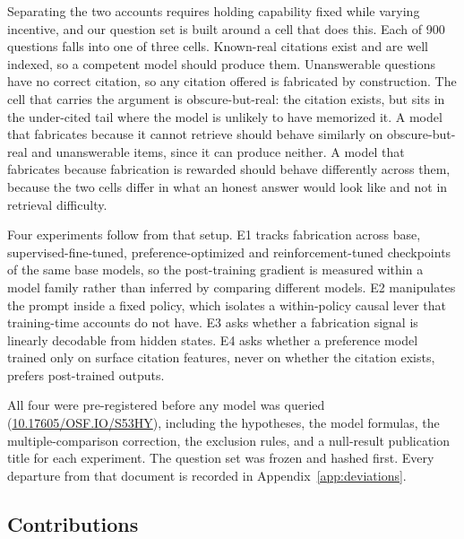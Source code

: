 Separating the two accounts requires holding capability fixed while varying
incentive, and our question set is built around a cell that does this. Each of
900 questions falls into one of three cells. Known-real citations exist and are
well indexed, so a competent model should produce them. Unanswerable questions
have no correct citation, so any citation offered is fabricated by construction.
The cell that carries the argument is obscure-but-real: the citation exists, but
sits in the under-cited tail where the model is unlikely to have memorized it.
A model that fabricates because it cannot retrieve should behave similarly on
obscure-but-real and unanswerable items, since it can produce neither. A model
that fabricates because fabrication is rewarded should behave differently across
them, because the two cells differ in what an honest answer would look like and
not in retrieval difficulty.

Four experiments follow from that setup. E1 tracks fabrication across base,
supervised-fine-tuned, preference-optimized and reinforcement-tuned checkpoints
of the same base models, so the post-training gradient is measured within a
model family rather than inferred by comparing different models. E2 manipulates
the prompt inside a fixed policy, which isolates a within-policy causal lever
that training-time accounts do not have. E3 asks whether a fabrication signal is
linearly decodable from hidden states. E4 asks whether a preference model
trained only on surface citation features, never on whether the citation exists,
prefers post-trained outputs.

All four were pre-registered before any model was queried
(\href{https://doi.org/10.17605/OSF.IO/S53HY}{10.17605/OSF.IO/S53HY}), including
the hypotheses, the model formulas, the multiple-comparison correction, the
exclusion rules, and a null-result publication title for each experiment. The
question set was frozen and hashed first. Every departure from that document is
recorded in Appendix~\ref{app:deviations}.

\subsection{Contributions}


